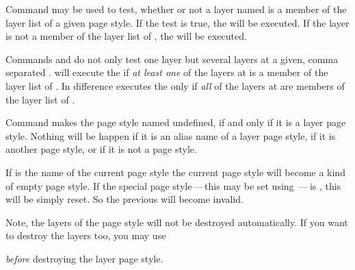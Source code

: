 \begin{Declaration}
\end{Declaration}
Command  may be used to test, whether or not a layer
named  is a member of the layer list of a given page
style. If the test is true, the  will be executed. If the
layer is not a member of the layer list of , the
 will be executed.

Commands  and  do not
only test one layer but several layers at a given, comma separated
.  will execute the
 if \emph{at least one} of the layers at 
is a member of the layer list of . In difference
 executes the  only if \emph{all}
of the layers at  are members of the layer list of
.%
\EndIndexGroup


\begin{Declaration}
\end{Declaration}
Command  makes the page style named
 undefined, if and only if it is a layer page
style. Nothing will be happen if it is an alias name of a layer page style, if
it is another page style, or if it is not a page style. 

If  is the name of the current page style the current
page style will become a kind of empty page style. If the special page
style\,---\,this may be set using \,---\,is , this will be simply reset. So the previous
 will become invalid.

Note, the layers of the page style will not be destroyed
automatically. If you want to destroy the layers too, you may use
\begin{lstcode}
\end{lstcode}
\emph{before} destroying the layer page style.


